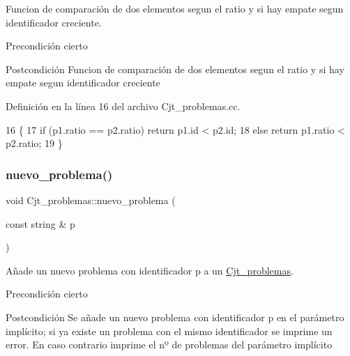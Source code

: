 Funcion de comparación de dos elementos segun el ratio y si hay empate segun identificador creciente. 

\begin{DoxyPrecond}{Precondición}
cierto 
\end{DoxyPrecond}
\begin{DoxyPostcond}{Postcondición}
Funcion de comparación de dos elementos segun el ratio y si hay empate segun identificador creciente 
\end{DoxyPostcond}


Definición en la línea 16 del archivo Cjt\+\_\+problemas.\+cc.


\begin{DoxyCode}
16                                              \{
17       \textcolor{keywordflow}{if} (p1.ratio == p2.ratio) \textcolor{keywordflow}{return} p1.id < p2.id;
18       \textcolor{keywordflow}{else} \textcolor{keywordflow}{return} p1.ratio < p2.ratio;
19     \}
\end{DoxyCode}
\mbox{\label{class_cjt__problemas_a6c84adcab542d776e02f851eb9d3da82}} 
\subsubsection{\texorpdfstring{nuevo\+\_\+problema()}{nuevo\_problema()}}
{\footnotesize\ttfamily void Cjt\+\_\+problemas\+::nuevo\+\_\+problema (\begin{DoxyParamCaption}\item[{const string \&}]{p }\end{DoxyParamCaption})}



Añade un nuevo problema con identificador p a un \mbox{\hyperlink{class_cjt__problemas}{Cjt\+\_\+problemas}}. 

\begin{DoxyPrecond}{Precondición}
cierto 
\end{DoxyPrecond}
\begin{DoxyPostcond}{Postcondición}
Se añade un nuevo problema con identificador p en el parámetro implícito; si ya existe un problema con el mismo identificador se imprime un error. En caso contrario imprime el nº de problemas del parámetro implícito 
\end{DoxyPostcond}


